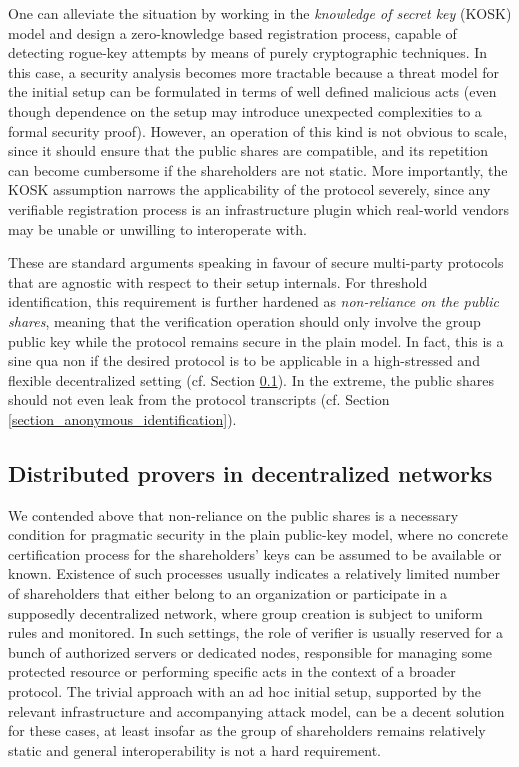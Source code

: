 \documentclass[psamsfonts, reqno]{amsart}
\theoremstyle{definition}
\theoremstyle{remark}
\numberwithin{equation}{section}
\begin{document}
One can alleviate the situation by working in the
\textit{knowledge of secret key} (KOSK) model
and design a zero-knowledge based registration process,
capable of detecting rogue-key attempts
by means of purely cryptographic techniques.
In this case, a security analysis becomes more tractable
because a threat model for the initial setup can be
formulated in terms of well defined malicious acts
(even though dependence on the setup
may introduce unexpected complexities
to a formal security proof).
However, an operation of this kind is not obvious to scale,
since it should ensure that the public shares are compatible,
and its repetition can become cumbersome
if the shareholders are not static.
More importantly, the KOSK assumption narrows
the applicability of the protocol severely,
since any verifiable registration process
is an infrastructure plugin which real-world vendors
may be unable or unwilling to interoperate with.

These are standard arguments speaking in favour
of secure multi-party protocols that are agnostic
with respect to their setup internals.
For threshold identification,
this requirement is further hardened as
\textit{non-reliance on the public shares},
meaning that the verification operation should only involve
the group public key while the protocol
remains secure in the plain model.
In fact, this is a sine qua non if the desired protocol is
to be applicable in a high-stressed and flexible
decentralized setting
(cf. Section \ref{section_distributed_provers}).
In the extreme, the public shares should not even
leak from the protocol transcripts
(cf. Section \ref{section_anonymous_identification}).


\subsection{Distributed provers in decentralized networks}\label{section_distributed_provers}

We contended above that non-reliance on the public shares
is a necessary condition for pragmatic security
in the plain public-key model, where
no concrete certification process
for the shareholders' keys can be assumed
to be available or known.
Existence of such processes usually indicates
a relatively limited number of shareholders
that either belong to an organization or participate
in a supposedly decentralized network,
where group creation is subject to uniform rules
and monitored. In such settings,
the role of verifier is usually reserved for
a bunch of authorized servers or dedicated nodes,
responsible for managing some protected resource or
performing specific acts in the context of a broader protocol.
The trivial approach with an ad hoc initial setup,
supported by the relevant infrastructure
and accompanying attack model,
can be a decent solution for these cases,
at least insofar as the group of shareholders
remains relatively static
and general interoperability
is not a hard requirement.
\end{document}
